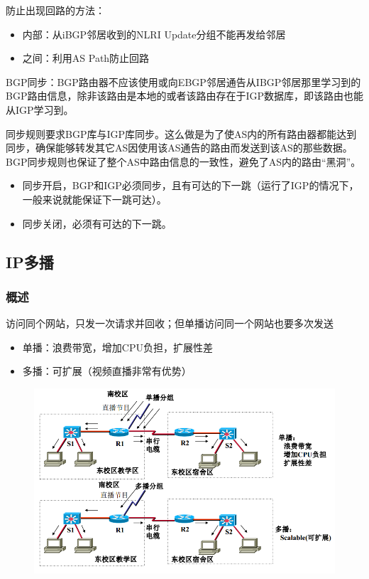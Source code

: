 \myhline
防止出现回路的方法：
\begin{itemize}
\item 内部：从iBGP邻居收到的NLRI Update分组不能再发给邻居
\item 之间：利用AS Path防止回路
\end{itemize}

BGP同步：BGP路由器不应该使用或向EBGP邻居通告从IBGP邻居那里学习到的BGP路由信息，除非该路由是本地的或者该路由存在于IGP数据库，即该路由也能从IGP学习到。

同步规则要求BGP库与IGP库同步。这么做是为了使AS内的所有路由器都能达到同步，确保能够转发其它AS因使用该AS通告的路由而发送到该AS的那些数据。BGP同步规则也保证了整个AS中路由信息的一致性，避免了AS内的路由“黑洞”。

\begin{itemize}
	\item 同步开启，BGP和IGP必须同步，且有可达的下一跳（运行了IGP的情况下，一般来说就能保证下一跳可达）。
	\item 同步关闭，必须有可达的下一跳。
\end{itemize}

\subsection{IP多播}
\subsubsection{概述}
访问同个网站，只发一次请求并回收；但单播访问同一个网站也要多次发送
\begin{itemize}
\item 单播：浪费带宽，增加CPU负担，扩展性差
\item 多播：可扩展（视频直播非常有优势）
\end{itemize}
\begin{figure}[H]
	\centering
	\includegraphics[width=0.8\linewidth]{fig/multicast.png}
\end{figure}

